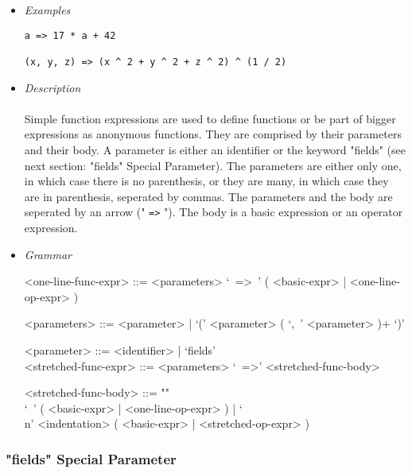 \documentclass{article}
\begin{document}
\begin{itemize}
\item \textit{Examples}

\begin{verbatim}
a => 17 * a + 42

(x, y, z) => (x ^ 2 + y ^ 2 + z ^ 2) ^ (1 / 2)
\end{verbatim}

\item \textit{Description}\\\\
Simple function expressions are used to define functions or be part of bigger
expressions as anonymous functions. They are comprised by their parameters and
their body. A parameter is either an identifier or the keyword "fields" (see
next section: "fields" Special Parameter). The parameters are either only one,
in which case there is no parenthesis, or they are many, in which case they are
in parenthesis, seperated by commas. The parameters and the body are seperated
by an arrow (" \texttt{=>} "). The body is a basic expression or an operator
expression.

\item \textit{Grammar}
\begin{grammar}
<one-line-func-expr> ::=
<parameters> `\ =>\ ' ( <basic-expr> | <one-line-op-expr> )

<parameters> ::= <parameter> | `(' <parameter> ( `,\ ' <parameter> )+ `)'

<parameter> ::= <identifier> | `fields'\\

<stretched-func-expr> ::= <parameters> `\ =>' <stretched-func-body>

<stretched-func-body> ::= ""\\
`\ ' ( <basic-expr> | <one-line-op-expr> ) | 
`\\n' <indentation> ( <basic-expr> | <stretched-op-expr> )
\end{grammar}
\end{itemize}

\subsubsection{"fields" Special Parameter}
\end{document}

